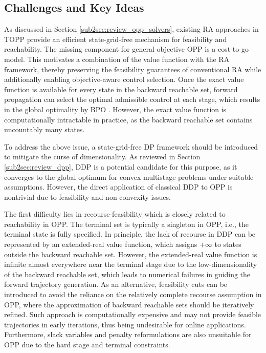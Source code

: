 \documentclass[journal]{IEEEtran}
\theoremstyle{definition}
\theoremstyle{definition}
\begin{document}
\subsection{Challenges and Key Ideas}\label{subsec:key_ideas}

As discussed in Section \ref{sub2sec:review_opp_solvers}, existing RA approaches in TOPP \cite{pham2018new,dio2025time} provide an efficient state-grid-free mechanism for feasibility and reachability. The missing component for general-objective OPP is a cost-to-go model. This motivates a combination of the value function with the RA framework, thereby preserving the feasibility guarantees of conventional RA while additionally enabling objective-aware control selection. Once the exact value function is available for every state in the backward reachable set, forward propagation can select the optimal admissible control at each stage, which results in the global optimality by BPO \cite{bellman1952theory}. However, the exact value function is computationally intractable in practice, as the backward reachable set contains uncountably many states.

To address the above issue, a state-grid-free DP framework should be introduced to mitigate the curse of dimensionality. As reviewed in Section \ref{sub2sec:review_dpp}, DDP is a potential candidate for this purpose, as it converges to the global optimum for convex multistage problems under suitable assumptions. However, the direct application of classical DDP to OPP is nontrivial due to feasibility and non-convexity issues.

The first difficulty lies in recourse-feasibility which is closely related to reachability in OPP. The terminal set is typically a singleton in OPP, i.e., the terminal state is fully specified. In principle, the lack of recourse in DDP can be represented by an extended-real value function, which assigns $+\infty$ to states outside the backward reachable set. However, the extended-real value function is infinite almost everywhere near the terminal stage due to the low-dimensionality of the backward reachable set, which leads to numerical failures in guiding the forward trajectory generation. As an alternative, feasibility cuts can be introduced to avoid the reliance on the relatively complete recourse assumption in OPP, where the approximation of backward reachable sets should be iteratively refined. Such approach is computationally expensive and may not provide feasible trajectories in early iterations, thus being undesirable for online applications. Furthermore, slack variables and penalty reformulations are also unsuitable for OPP due to the hard stage and terminal constraints.
\end{document}
